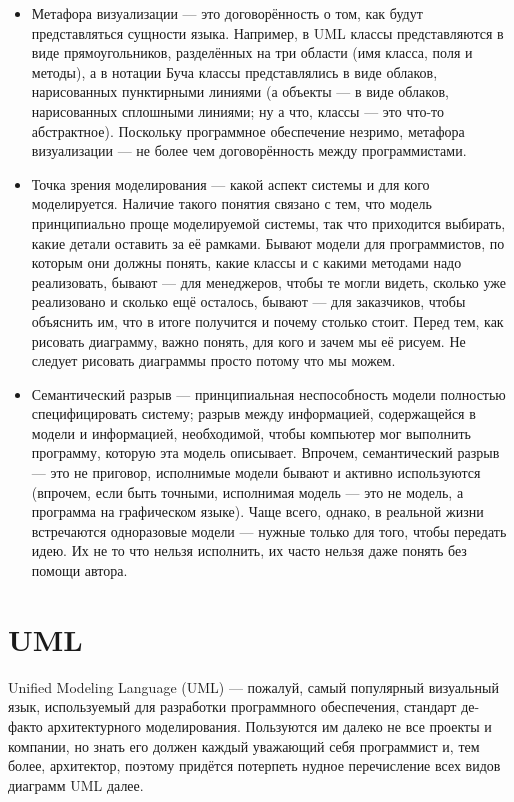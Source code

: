 \documentclass{../../text-style}
\begin{document}
\begin{itemize}
    \item Метафора визуализации --- это договорённость о том, как будут представляться сущности языка. Например, в UML классы представляются в виде прямоугольников, разделённых на три области (имя класса, поля и методы), а в нотации Буча классы представлялись в виде облаков, нарисованных пунктирными линиями (а объекты --- в виде облаков, нарисованных сплошными линиями; ну а что, классы --- это что-то абстрактное). Поскольку программное обеспечение незримо, метафора визуализации --- не более чем договорённость между программистами.
    \item Точка зрения моделирования --- какой аспект системы и для кого моделируется. Наличие такого понятия связано с тем, что модель принципиально проще моделируемой системы, так что приходится выбирать, какие детали оставить за её рамками. Бывают модели для программистов, по которым они должны понять, какие классы и с какими методами надо реализовать, бывают --- для менеджеров, чтобы те могли видеть, сколько уже реализовано и сколько ещё осталось, бывают --- для заказчиков, чтобы объяснить им, что в итоге получится и почему столько стоит. Перед тем, как рисовать диаграмму, важно понять, для кого и зачем мы её рисуем. Не следует рисовать диаграммы просто потому что мы можем.
    \item Семантический разрыв --- принципиальная неспособность модели полностью специфицировать систему; разрыв между информацией, содержащейся в модели и информацией, необходимой, чтобы компьютер мог выполнить программу, которую эта модель описывает. Впрочем, семантический разрыв --- это не приговор, исполнимые модели бывают и активно используются (впрочем, если быть точными, исполнимая модель --- это не модель, а программа на графическом языке). Чаще всего, однако, в реальной жизни встречаются одноразовые модели --- нужные только для того, чтобы передать идею. Их не то что нельзя исполнить, их часто нельзя даже понять без помощи автора.
\end{itemize}

\section{UML}

Unified Modeling Language (UML) --- пожалуй, самый популярный визуальный язык, используемый для разработки программного обеспечения, стандарт де-факто архитектурного моделирования. Пользуются им далеко не все проекты и компании, но знать его должен каждый уважающий себя программист и, тем более, архитектор, поэтому придётся потерпеть нудное перечисление всех видов диаграмм UML далее. 
\end{document}
